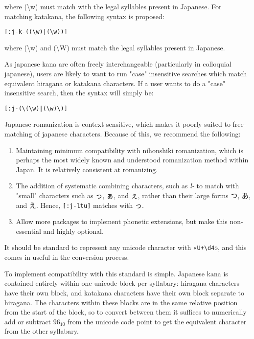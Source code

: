 \documentclass{article}
\begin{document}
where (\textbackslash w) must match with the legal syllables present in Japanese. For matching
katakana, the following syntax is proposed:

\texttt{[:j-k-(\*(\textbackslash w)|(\textbackslash w)\*)]}

where (\textbackslash w) and (\textbackslash W) must match the legal syllables present in Japanese.

As japanese kana are often freely interchangeable (particularly in colloquial
japanese), users are likely to want to run "case" insensitive searches which
match equivalent hiragana or katakana characters. If  a user wants to do a
"case" insensitive search, then the syntax will simply be:

\texttt{[:j-(\textbackslash *(\textbackslash w)|(\textbackslash w)\textbackslash *)]}

Japanese romanization is context sensitive, which makes it poorly suited to
free-matching of japanese characters. Because of this, we recommend the
following:

\begin{enumerate}
  \item Maintaining minimum compatibility with nihonshiki romanization, which is
    perhaps the most widely known and understood romanization method within
    Japan. It is relatively consistent at romanizing.
  \item The addition of systematic combining characters, such as \textit{l-} to
    match with "small" characters such as っ, ぁ, and ぇ, rather than their
    large forms つ, あ, and え. Hence, \texttt{[:j-ltu]} matches with っ.
  \item Allow more packages to implement phonetic extensions, but make this
    non-essential and highly optional.
\end{enumerate}

It should be standard to represent any unicode character with
«\texttt{U+\textbackslash d{4}}», and this comes in useful in the conversion process.

To implement compatibility with this standard is simple. Japanese kana is
contained entirely within one unicode block per syllabary: hiragana characters
have their own block, and katakana characters have their own block separate to
hiragana.  The characters within these blocks are in the same relative position
from the start of the block, so to convert between them it suffices to
numerically add or subtract $ 96_{10} $ from the unicode code point to get the
equivalent character from the other syllabary.
\end{document}

